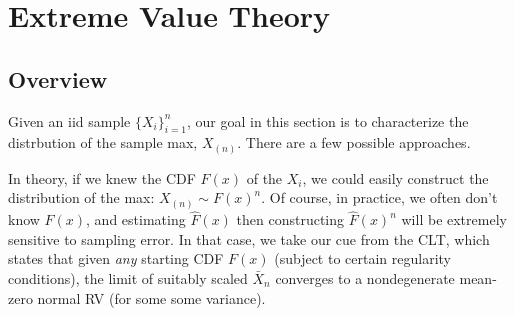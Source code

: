\documentclass[12pt]{article}
\theoremstyle{plain}
\theoremstyle{definition}
\theoremstyle{remark}
\begin{document}




\clearpage
\section{Extreme Value Theory}

\subsection{Overview}

Given an iid sample $\{X_i\}_{i=1}^n$, our goal in this section is to
characterize the distrbution of the sample max, $X_{(n)}$.
There are a few possible approaches.

In theory, if we knew the CDF $F(x)$ of the $X_i$, we could easily
construct the distribution of the max: $X_{(n)}\sim F(x)^n$.
Of course, in practice, we often don't know $F(x)$, and estimating
$\hat{F}(x)$ then constructing $\hat{F}(x)^n$ will be extremely
sensitive to sampling error.
In that case, we take our cue from the CLT, which states that
given \emph{any} starting CDF $F(x)$ (subject to certain regularity
conditions), the limit of suitably scaled $\bar{X}_n$ converges to a
nondegenerate mean-zero normal RV (for some some variance).
\end{document}
